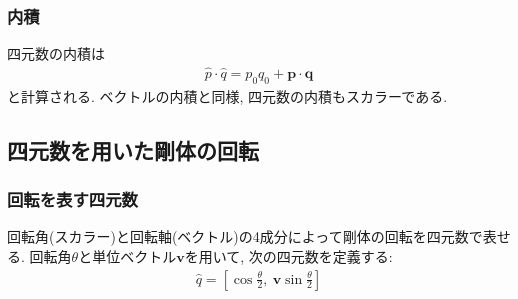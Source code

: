 \subsubsection{内積}
四元数の内積は
\begin{align}
 \hat{p} \cdot \hat{q} = p_{0}q_{0} + \mathbf{p} \cdot \mathbf{q}
\end{align}
と計算される.
ベクトルの内積と同様, 四元数の内積もスカラーである.


\subsection{四元数を用いた剛体の回転}
\subsubsection{回転を表す四元数}
回転角(スカラー)と回転軸(ベクトル)の4成分によって剛体の回転を四元数で表せる.
回転角$\theta$と単位ベクトル$\mathbf{v}$を用いて, 次の四元数を定義する:
\begin{align}
 \hat{q} 
=
 \left[\cos \frac{\theta}{2},~ \mathbf{v} \sin \frac{\theta}{2} \right]
\end{align}

